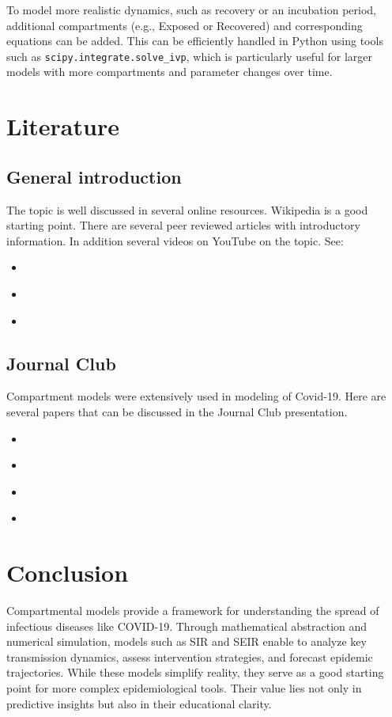 \documentclass{article}
\begin{document}
To model more realistic dynamics, such as recovery or an incubation period, additional compartments (e.g., Exposed or Recovered) and corresponding equations can be added. This can be efficiently handled in Python using tools such as \texttt{scipy.integrate.solve\_ivp}, which is particularly useful for larger models with more compartments and parameter changes over time.

\section{Literature}
\subsection{General introduction}
The topic is well discussed in several online resources. Wikipedia is a good starting point. There are several peer reviewed articles with introductory information. In addition several videos on YouTube on the topic. See:
\begin{itemize}
    \item \textcite{SIR_wiki}
     \item \textcite{SIR_AbouIsmail2020}
    \item \textcite{SIR_Tolles2020}
\end{itemize}

\subsection{Journal Club}
Compartment models were extensively used in modeling of Covid-19. Here are several papers that can be discussed in the Journal Club presentation.
\begin{itemize}
    \item \textcite{SIR_Bjrnstad2020}
   \item \textcite{SIR_Angulo2021}
    \item \textcite{SIR_Cooper2020}
    \item \textcite{SIR_He2020}

\end{itemize}


\section{Conclusion}
Compartmental models provide a framework for understanding the spread of infectious diseases like COVID-19. Through mathematical abstraction and numerical simulation, models such as SIR and SEIR enable to analyze key transmission dynamics, assess intervention strategies, and forecast epidemic trajectories. While these models simplify reality, they serve as a good starting point for more complex epidemiological tools. Their value lies not only in predictive insights but also in their educational clarity. 


\printbibliography
\end{document}
